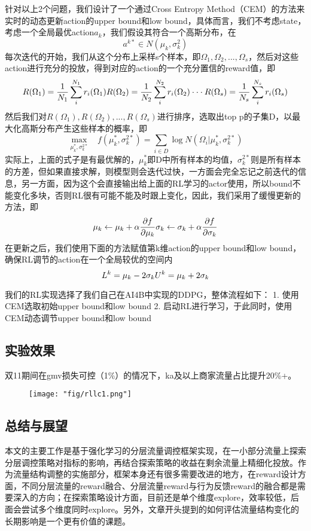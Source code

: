 针对以上2个问题，我们设计了一个通过Cross Entropy Method（CEM）的方法来实时的动态更新action的upper bound和low bound，具体而言，我们不考虑state，考虑一个全局最优action$a_k$，我们假设其符合一个高斯分布，在
$$
a^{k*} \in N(\mu_k, \sigma_k^2)
$$
每次迭代的开始，我们从这个分布上采样s个样本，即$\Omega_1,\Omega_2,...,\Omega_s$，然后对这些action进行充分的投放，得到对应的action的一个充分置信的reward值，即
$$
R(\Omega_1)= \frac{1}{N_1} \sum_i^{N_1} r_i(\Omega_1) \\
R(\Omega_2)= \frac{1}{N_2} \sum_i^{N_2} r_i(\Omega_2) \\
\cdot \cdot \cdot \\
R(\Omega_s)= \frac{1}{N_s} \sum_i^{N_s} r_i(\Omega_s)
$$
然后我们对$R(\Omega_1),R(\Omega_2),...,R(\Omega_s)$进行排序，选取出top p的子集D，以最大化高斯分布产生这些样本的概率，即
$$
\max_{\mu_k^*, \sigma_k^{2*}} \;\;\; f(\mu_k^*, \sigma_k^{2*}) = \sum_{i \in D} \log N(\Omega_i|\mu_k^*, \sigma_k^{2*})
$$
实际上，上面的式子是有最优解的，$\mu_k^*$即D中所有样本的均值，$ \sigma_k^{2*}$则是所有样本的方差，但如果直接求解，则模型则会迭代过快，一方面会完全忘记之前迭代的信息，另一方面，因为这个会直接输出给上面的RL学习的actor使用，所以bound不能变化多块，否则RL很有可能不能及时跟上变化，因此，我们采用了缓慢更新的方法，即
$$
\mu_k \leftarrow \mu_k + \alpha \frac{\partial f}{\partial  \mu_k} \\
\sigma_k \leftarrow \sigma_k + \alpha \frac{\partial f}{\partial  \sigma_k }
$$
在更新之后，我们使用下面的方法赋值第k维action的upper bound和low bound，确保RL调节的action在一个全局较优的空间内
$$
L^k = \mu_k - 2\sigma_k \\
U^k = \mu_k + 2\sigma_k \\
$$

我们的RL实现选择了我们自己在AI4B中实现的DDPG，整体流程如下：
1. 使用CEM选取初始upper bound和low bound
2. 启动RL进行学习，于此同时，使用CEM动态调节upper bound和low bound

\subsection{实验效果}
双11期间在gmv损失可控（1\%）的情况下，ka及以上商家流量占比提升20\%+。

\begin{figure}[!h]
	\centering
	\texttt{[image: "fig/rllc1.png"]}
	\caption{}
	\label{fig:rllc1}
\end{figure}

\subsection{总结与展望}
本文的主要工作是基于强化学习的分层流量调控框架实现，在一小部分流量上探索分层调控策略对指标的影响，再结合探索策略的收益在剩余流量上精细化投放。作为流量结构调整的实施部分，框架本身还有很多需要改进的地方，在reward设计方面，不同分层流量的reward融合、分层流量reward与行为反馈reward的融合都是需要深入的方向；在探索策略设计方面，目前还是单个维度explore，效率较低，后面会尝试多个维度同时explore。另外，文章开头提到的如何评估流量结构变化的长期影响是一个更有价值的课题。


